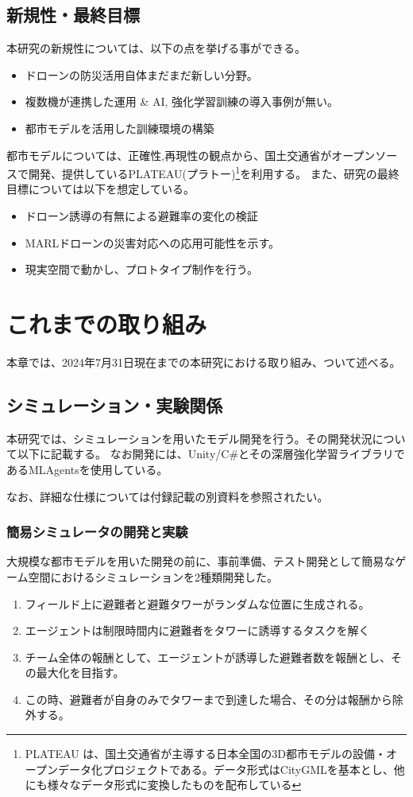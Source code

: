\documentclass{article}[jsarticle]
\begin{document}
\subsection{新規性・最終目標}
本研究の新規性については、以下の点を挙げる事ができる。
\begin{itemize}
    \item ドローンの防災活用自体まだまだ新しい分野。
    \item 複数機が連携した運用 \& AI, 強化学習訓練の導入事例が無い。
    \item 都市モデルを活用した訓練環境の構築
\end{itemize}
都市モデルについては、正確性,再現性の観点から、国土交通省がオープンソースで開発、提供しているPLATEAU(プラトー)\footnote{PLATEAU は、国土交通省が主導する日本全国の3D都市モデルの設備・オープンデータ化プロジェクトである。データ形式はCityGMLを基本とし、他にも様々なデータ形式に変換したものを配布している}を利用する。
また、研究の最終目標については以下を想定している。
\begin{itemize}
    \item ドローン誘導の有無による避難率の変化の検証
    \item MARLドローンの災害対応への応用可能性を示す。
    \item 現実空間で動かし、プロトタイプ制作を行う。
\end{itemize}

\section{これまでの取り組み}
\label{sec:previous}
本章では、2024年7月31日現在までの本研究における取り組み、ついて述べる。

\subsection{シミュレーション・実験関係}
本研究では、シミュレーションを用いたモデル開発を行う。その開発状況について以下に記載する。
なお開発には、Unity/C\#とその深層強化学習ライブラリであるML\-Agentsを使用している。\par 
なお、詳細な仕様については付録記載の別資料を参照されたい。

\subsubsection{簡易シミュレータの開発と実験}
大規模な都市モデルを用いた開発の前に、事前準備、テスト開発として簡易なゲーム空間におけるシミュレーションを2種類開発した。
\begin{enumerate}
    \item フィールド上に避難者と避難タワーがランダムな位置に生成される。
    \item エージェントは制限時間内に避難者をタワーに誘導するタスクを解く
    \item チーム全体の報酬として、エージェントが誘導した避難者数を報酬とし、その最大化を目指す。
    \item この時、避難者が自身のみでタワーまで到達した場合、その分は報酬から除外する。
\end{enumerate}
\end{document}

